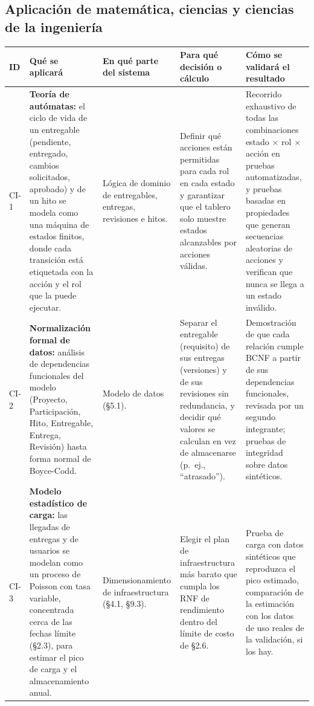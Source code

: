 \documentclass[10pt,a4paper]{article}
\newcommand{\hrow}{\rowcolor{encabezado}}
\newcommand{\h}[1]{\textbf{#1}}
\begin{document}
\subsection{Aplicación de matemática, ciencias y ciencias de la ingeniería}
\begin{xltabular}{\linewidth}{|P{1.4cm}|L|P{3.2cm}|P{3.0cm}|P{3.0cm}|}
\hline\hrow \h{ID} & \h{Qué se aplicará} & \h{En qué parte del sistema} & \h{Para qué decisión o cálculo} & \h{Cómo se validará el resultado} \\ \hline
\endhead
CI-1 & \textbf{Teoría de autómatas:} el ciclo de vida de un entregable (pendiente, entregado, cambios solicitados, aprobado) y de un hito se modela como una máquina de estados finitos, donde cada transición está etiquetada con la acción y el rol que la puede ejecutar. & Lógica de dominio de entregables, entregas, revisiones e hitos. & Definir qué acciones están permitidas para cada rol en cada estado y garantizar que el tablero solo muestre estados alcanzables por acciones válidas. & Recorrido exhaustivo de todas las combinaciones estado $\times$ rol $\times$ acción en pruebas automatizadas, y pruebas basadas en propiedades que generan secuencias aleatorias de acciones y verifican que nunca se llega a un estado inválido. \\ \hline
CI-2 & \textbf{Normalización formal de datos:} análisis de dependencias funcionales del modelo (Proyecto, Participación, Hito, Entregable, Entrega, Revisión) hasta forma normal de Boyce-Codd. & Modelo de datos (§5.1). & Separar el entregable (requisito) de sus entregas (versiones) y de sus revisiones sin redundancia, y decidir qué valores se calculan en vez de almacenarse (p.~ej., ``atrasado''). & Demostración de que cada relación cumple BCNF a partir de sus dependencias funcionales, revisada por un segundo integrante; pruebas de integridad sobre datos sintéticos. \\ \hline
CI-3 & \textbf{Modelo estadístico de carga:} las llegadas de entregas y de usuarios se modelan como un proceso de Poisson con tasa variable, concentrada cerca de las fechas límite (§2.3), para estimar el pico de carga y el almacenamiento anual. & Dimensionamiento de infraestructura (§4.1, §9.3). & Elegir el plan de infraestructura más barato que cumpla los RNF de rendimiento dentro del límite de costo de §2.6. & Prueba de carga con datos sintéticos que reproduzca el pico estimado, comparación de la estimación con los datos de uso reales de la validación, si los hay. \\ \hline
\end{xltabular}
\end{document}
